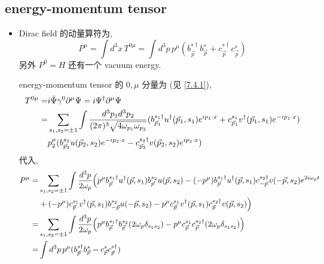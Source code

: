 \subsection{energy-momentum tensor}
\begin{itemize}
	\item Dirac field 的动量算符为,
	\begin{equation}
		P^\mu = \int d^3 x \, T^{0 \mu} = \int d^3 p \, p^\mu (b^{s \dag}_{\vec{p}} b^s_{\vec{p}} + c^{s \dag}_{\vec{p}} c^s_{\vec{p}})
	\end{equation}
	另外 $P^0 = H$ 还有一个 vacuum energy.
	
	\begin{tcolorbox}[title=calculation:]
		energy-momentum tensor 的 $0, \mu$ 分量为 (见 \eqref{7.4.1}),
		\begin{align}
			T^{0 \mu} =& i \bar{\Psi} \gamma^0 \partial^\mu \Psi = i \Psi^\dag \partial^\mu \Psi \notag \\
			=& \sum_{s_1, s_2 = \pm 1} \int \frac{d^3 p_1 d^3 p_2}{(2 \pi)^3 \sqrt{4 \omega_{p_1} \omega_{p_2}}} (b^{s_1 \dag}_{\vec{p}_1} u^\dag(\vec{p}_1, s_1) e^{i p_1 \cdot x} + c^{s_1}_{\vec{p}_1} v^\dag(\vec{p}_1, s_1) e^{- i p_1 \cdot x}) \notag \\
			& p_2^\mu (b^{s_2}_{\vec{p}_2} u(\vec{p}_2, s_2) e^{- i p_2 \cdot x} - c^{s_2 \dag}_{\vec{p}_2} v(\vec{p}_2, s_2) e^{i p_2 \cdot x})
		\end{align}
		代入,
		\begin{align}
			P^\mu =& \sum_{s_1, s_2 = \pm 1} \int \frac{d^3 p}{2 \omega_p} \Big( p^\mu b^{s_1 \dag}_{\vec{p}} u^\dag(\vec{p}, s_1) b^{s_2}_{\vec{p}} u(\vec{p}, s_2) - (- p^\mu) b^{s_1 \dag}_{\vec{p}} u^\dag(\vec{p}, s_1) c^{s_2 \dag}_{- \vec{p}} v(- \vec{p}, s_2) e^{2 i \omega_p t} \notag \\
			& + (- p^\mu) c^{s_1}_{\vec{p}} v^\dag(\vec{p}, s_1) b^{s_2}_{- \vec{p}} u(- \vec{p}, s_2) - p^\mu c^{s_1}_{\vec{p}} v^\dag(\vec{p}, s_1) c^{s_2 \dag}_{\vec{p}} v(\vec{p}, s_2) \Big) \notag \\
			=& \sum_{s_1, s_2 = \pm 1} \int \frac{d^3 p}{2 \omega_p} \Big( p^\mu b^{s_1 \dag}_{\vec{p}} b^{s_2}_{\vec{p}} (2 \omega_p \delta_{s_1 s_2}) - p^\mu c^{s_1}_{\vec{p}} c^{s_2 \dag}_{\vec{p}} (2 \omega_p \delta_{s_1 s_2}) \Big) \notag \\
			=& \int d^3 p \, p^\mu (b^{s \dag}_{\vec{p}} b^s_{\vec{p}} - c^s_{\vec{p}} c^{s \dag}_{\vec{p}})
		\end{align}
	\end{tcolorbox}
\end{itemize}

